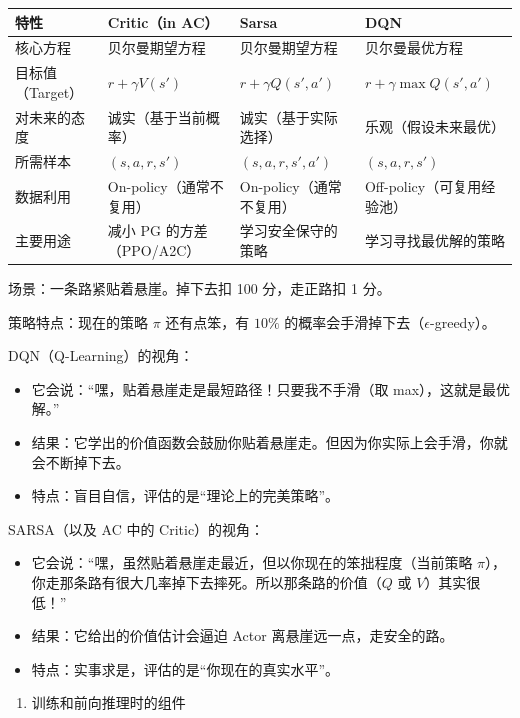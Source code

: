 \begin{longtable}[]{@{}llll@{}}
\toprule
特性 & Critic（in AC） & Sarsa & DQN \\
\midrule
\endhead
核心方程 & 贝尔曼期望方程 & 贝尔曼期望方程 & 贝尔曼最优方程 \\
目标值（Target） & \(r+\gamma V(s')\) & \(r+\gamma Q(s',a')\) & \(r+\gamma\max Q(s',a')\) \\
对未来的态度 & 诚实（基于当前概率） & 诚实（基于实际选择） & 乐观（假设未来最优） \\
所需样本 & \((s,a,r,s')\) & \((s,a,r,s',a')\) & \((s,a,r,s')\) \\
数据利用 & On-policy（通常不复用） & On-policy（通常不复用） & Off-policy（可复用经验池） \\
主要用途 & 减小 PG 的方差（PPO/A2C） & 学习安全保守的策略 & 学习寻找最优解的策略 \\
\bottomrule
\end{longtable}

场景：一条路紧贴着悬崖。掉下去扣 100 分，走正路扣 1 分。

策略特点：现在的策略 \(\pi\) 还有点笨，有 \(10\%\) 的概率会手滑掉下去（\(\epsilon\)-greedy）。

DQN（Q-Learning）的视角：

\begin{itemize}
\tightlist
\item
  它会说：``嘿，贴着悬崖走是最短路径！只要我不手滑（取 max），这就是最优解。''
\item
  结果：它学出的价值函数会鼓励你贴着悬崖走。但因为你实际上会手滑，你就会不断掉下去。
\item
  特点：盲目自信，评估的是``理论上的完美策略''。
\end{itemize}

SARSA（以及 AC 中的 Critic）的视角：

\begin{itemize}
\tightlist
\item
  它会说：``嘿，虽然贴着悬崖走最近，但以你现在的笨拙程度（当前策略 \(\pi\)），你走那条路有很大几率掉下去摔死。所以那条路的价值（\(Q\) 或 \(V\)）其实很低！''
\item
  结果：它给出的价值估计会逼迫 Actor 离悬崖远一点，走安全的路。
\item
  特点：实事求是，评估的是``你现在的真实水平''。
\end{itemize}

\begin{enumerate}
\def\labelenumi{\arabic{enumi}.}
\setcounter{enumi}{4}
\tightlist
\item
  训练和前向推理时的组件
\end{enumerate}

